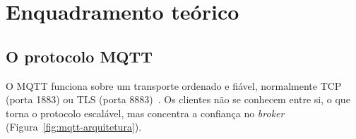 \section{Enquadramento teórico}
\label{sec:enquadramento}

\subsection{O protocolo MQTT}
\label{sec:mqtt}

O MQTT funciona sobre um transporte ordenado e fiável, normalmente TCP (porta 1883)
ou TLS (porta 8883)~\cite[§4.2]{oasis-mqtt311}. Os clientes não se conhecem entre si, o
que torna o protocolo escalável, mas concentra a confiança no \emph{broker}
(Figura~\ref{fig:mqtt-arquitetura}).

